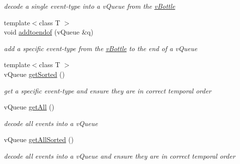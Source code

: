 \begin{DoxyCompactItemize}
\begin{DoxyCompactList}\small\item\em decode a single event-\/type into a v\+Queue from the \hyperlink{classev_1_1vBottle}{v\+Bottle} \end{DoxyCompactList}\item 
{\footnotesize template$<$class T $>$ }\\void \hyperlink{classev_1_1vBottle_a65bf90aec03b80dee45bf834efe3fbfc}{addtoendof} (v\+Queue \&q)\hypertarget{classev_1_1vBottle_a65bf90aec03b80dee45bf834efe3fbfc}{}\label{classev_1_1vBottle_a65bf90aec03b80dee45bf834efe3fbfc}

\begin{DoxyCompactList}\small\item\em add a specific event-\/type from the \hyperlink{classev_1_1vBottle}{v\+Bottle} to the end of a v\+Queue \end{DoxyCompactList}\item 
{\footnotesize template$<$class T $>$ }\\v\+Queue \hyperlink{classev_1_1vBottle_a27569b9aaa7eb1ff9135d435b841c2de}{get\+Sorted} ()\hypertarget{classev_1_1vBottle_a27569b9aaa7eb1ff9135d435b841c2de}{}\label{classev_1_1vBottle_a27569b9aaa7eb1ff9135d435b841c2de}

\begin{DoxyCompactList}\small\item\em get a specific event-\/type and ensure they are in correct temporal order \end{DoxyCompactList}\item 
v\+Queue \hyperlink{classev_1_1vBottle_af2abadf41f73c455dd451e34e9ba3376}{get\+All} ()\hypertarget{classev_1_1vBottle_af2abadf41f73c455dd451e34e9ba3376}{}\label{classev_1_1vBottle_af2abadf41f73c455dd451e34e9ba3376}

\begin{DoxyCompactList}\small\item\em decode all events into a v\+Queue \end{DoxyCompactList}\item 
v\+Queue \hyperlink{classev_1_1vBottle_a273cfda65fed58bcf19cedf6652948d9}{get\+All\+Sorted} ()\hypertarget{classev_1_1vBottle_a273cfda65fed58bcf19cedf6652948d9}{}\label{classev_1_1vBottle_a273cfda65fed58bcf19cedf6652948d9}

\begin{DoxyCompactList}\small\item\em decode all events into a v\+Queue and ensure they are in correct temporal order \end{DoxyCompactList}\end{DoxyCompactItemize}


